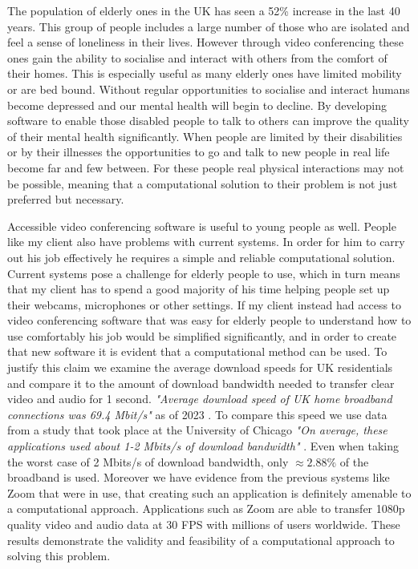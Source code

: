 The population of elderly ones in the UK has seen a 52\% 
increase in the last 40 years. This group of people includes
a large number of those who are isolated and feel a sense of 
loneliness in their lives. However through video conferencing
these ones gain the ability to socialise and interact with 
others from the comfort of their homes. This is especially 
useful as many elderly ones have limited mobility or are bed 
bound. Without regular opportunities to socialise and interact 
humans become depressed and our mental health will begin to 
decline. By developing software to enable those disabled 
people to talk to others can improve the quality of their 
mental health significantly. When people are limited by their 
disabilities or by their illnesses the opportunities to go and
talk to new people in real life become far and few between. For
these people real physical interactions may not be possible,
meaning that a computational solution to their problem is not
just preferred but necessary. \vspace{0.2cm}

Accessible video conferencing software is useful to young 
people as well. People like my client also have problems with 
current systems. In order for him to carry out his job 
effectively he requires a simple and reliable computational
solution. Current systems pose a challenge for elderly people 
to use, which in turn means that my client has to spend a good
majority of his time helping people set up their webcams,
microphones or other settings. If my client instead had access
to video conferencing software that was easy for elderly people
to understand how to use comfortably his job would be 
simplified significantly, and in order to create that new 
software it is evident that a computational method can be 
used. To justify this claim we examine the average download
speeds for UK residentials and compare it to the amount of 
download bandwidth needed to transfer clear video and audio 
for 1 second. \textit{"Average download speed of UK home 
broadband connections was 69.4 Mbit/s"} as of 2023 \cite{data}.
To compare this speed we use data from a study that took place
at the University of Chicago \textit{"On average, these
applications used about 1-2 Mbits/s of download bandwidth"}
\cite{chicago}. Even when taking the worst case of 2 Mbits/s
of download bandwidth, only $\approx 2.88\%$ of the broadband
is used. Moreover we have evidence from the previous systems 
like Zoom that were in use, that creating such an application
is definitely amenable to a computational approach.
Applications such as Zoom are able to transfer 1080p quality
video and audio data at 30 FPS with millions of users 
worldwide. These results demonstrate the validity and
feasibility of a computational approach to solving this
problem. \\ \vspace{0.2cm}

